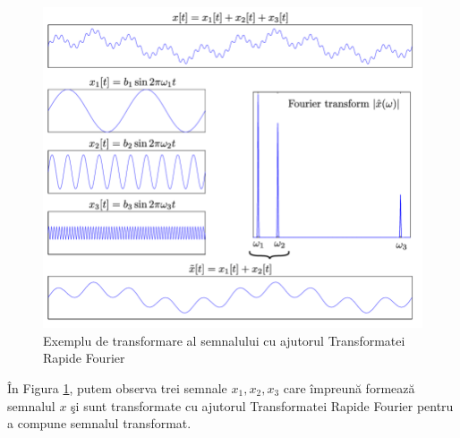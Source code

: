 	\begin{figure}[!htb]
		\centering
		\includegraphics[width=15cm]{imagini/fft.png}
		\caption{Exemplu de transformare al semnalului cu ajutorul Transformatei Rapide Fourier}
		\label{Fig14}
	\end{figure}
	
	\^{I}n Figura \ref{Fig14}, putem observa trei semnale $x_1, x_2, x_3$ care \^{i}mpreun\u{a} formeaz\u{a} semnalul $x$ \c{s}i sunt transformate cu ajutorul Transformatei Rapide Fourier pentru a compune semnalul transformat.